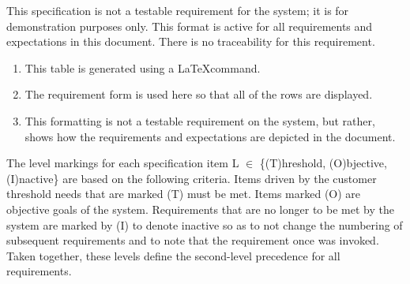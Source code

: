 {This specification is not a testable requirement for the system; it is for demonstration purposes only.}
{This format is active for all requirements and expectations in this document.}
{There is no traceability for this requirement.}
{
\begin{enumerate}
	\item This table is generated using a \LaTeX command.
   \item The requirement form is used here so that all of the rows are displayed.
   \item This formatting is not a testable requirement on the system, but rather, shows how the requirements and expectations are depicted in the document.
\end{enumerate}
}

The level markings for each specification item L $\in$ \{(T)hreshold, (O)bjective, (I)nactive\} are based on the following criteria.
Items driven by the customer threshold needs that are marked (T) must be met.
Items marked (O) are objective goals of the system.
Requirements that are no longer to be met by the system are marked by (I) to denote inactive so as to not change the numbering of subsequent requirements and to note that the requirement once was invoked. 
Taken together, these levels define the second-level precedence for all requirements.



